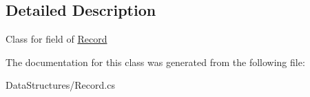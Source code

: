 \subsection{Detailed Description}
Class for field of \hyperlink{class_dwarf_d_b_1_1_data_structures_1_1_record}{Record} 



The documentation for this class was generated from the following file\+:\begin{DoxyCompactItemize}
\item 
Data\+Structures/Record.\+cs\end{DoxyCompactItemize}
